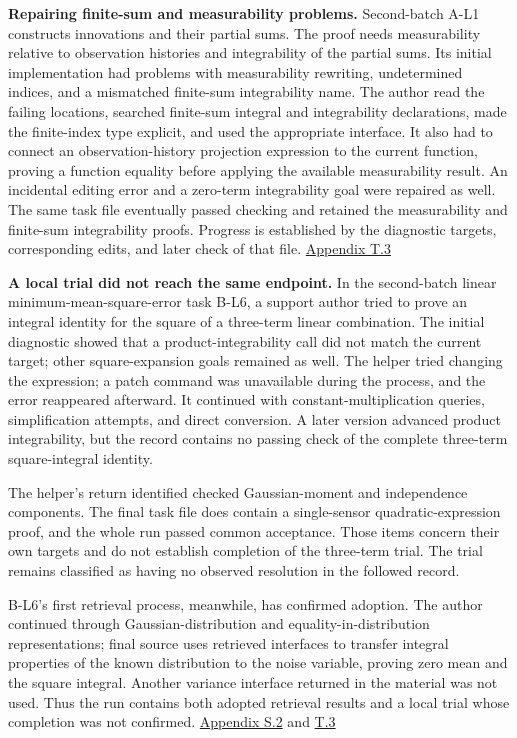 \textbf{Repairing finite-sum and measurability problems.} Second-batch A-L1 constructs innovations and their partial sums. The proof needs measurability relative to observation histories and integrability of the partial sums. Its initial implementation had problems with measurability rewriting, undetermined indices, and a mismatched finite-sum integrability name. The author read the failing locations, searched finite-sum integral and integrability declarations, made the finite-index type explicit, and used the appropriate interface. It also had to connect an observation-history projection expression to the current function, proving a function equality before applying the available measurability result. An incidental editing error and a zero-term integrability goal were repaired as well. The same task file eventually passed checking and retained the measurability and finite-sum integrability proofs. Progress is established by the diagnostic targets, corresponding edits, and later check of that file. \href{en-appendix.pdf\#t3}{Appendix T.3}

\textbf{A local trial did not reach the same endpoint.} In the second-batch linear minimum-mean-square-error task B-L6, a support author tried to prove an integral identity for the square of a three-term linear combination. The initial diagnostic showed that a product-integrability call did not match the current target; other square-expansion goals remained as well. The helper tried changing the expression; a patch command was unavailable during the process, and the error reappeared afterward. It continued with constant-multiplication queries, simplification attempts, and direct conversion. A later version advanced product integrability, but the record contains no passing check of the complete three-term square-integral identity.

The helper's return identified checked Gaussian-moment and independence components. The final task file does contain a single-sensor quadratic-expression proof, and the whole run passed common acceptance. Those items concern their own targets and do not establish completion of the three-term trial. The trial remains classified as having no observed resolution in the followed record.

B-L6's first retrieval process, meanwhile, has confirmed adoption. The author continued through Gaussian-distribution and equality-in-distribution representations; final source uses retrieved interfaces to transfer integral properties of the known distribution to the noise variable, proving zero mean and the square integral. Another variance interface returned in the material was not used. Thus the run contains both adopted retrieval results and a local trial whose completion was not confirmed. \href{en-appendix.pdf\#s2}{Appendix S.2} and \href{en-appendix.pdf\#t3}{T.3}

